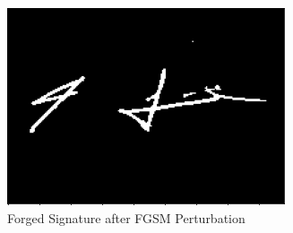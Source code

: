 \begin{figure}[h]
    \begin{center}
        \includegraphics[width=0.8\linewidth]{improved_forge.png}
    \end{center}
    \caption{Forged Signature after FGSM Perturbation}
    \label{fig:improved_forge}
\end{figure}







